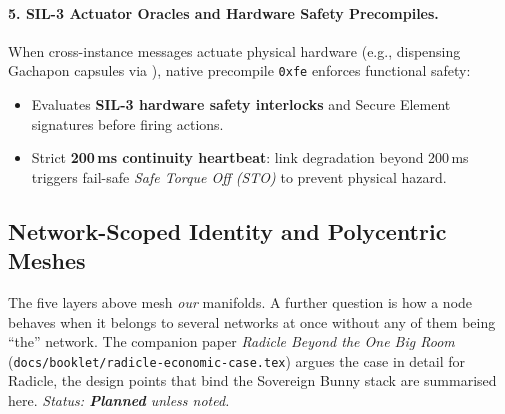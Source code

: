\documentclass[a4paper,11pt,twoside,parskip=half-,headings=small]{scrartcl}
\newcommand{\stPlan}{\textcolor{mute}{\textbf{Planned}}}
\newcommand{\code}[1]{\texttt{#1}}
\begin{document}
\paragraph{5. SIL-3 Actuator Oracles and Hardware Safety Precompiles.}
When cross-instance messages actuate physical hardware (e.g., dispensing Gachapon capsules via ), native precompile \code{0xfe} enforces functional safety:
\begin{itemize}[nosep]
  \item Evaluates \textbf{SIL-3 hardware safety interlocks} and Secure Element signatures before firing actions.
  \item Strict \textbf{200\,ms continuity heartbeat}: link degradation beyond 200\,ms triggers fail-safe \emph{Safe Torque Off (STO)} to prevent physical hazard.
\end{itemize}

\subsection{Network-Scoped Identity and Polycentric Meshes}
\label{sec:scoped_networks}

The five layers above mesh \emph{our} manifolds. A further question is how a node behaves when it belongs to several
networks at once without any of them being ``the'' network. The companion paper
\emph{Radicle Beyond the One Big Room} (\code{docs/booklet/radicle-economic-case.tex}) argues the case in detail for Radicle,
the design points that bind the Sovereign Bunny stack are summarised here. \emph{Status: \stPlan{} unless noted.}
\end{document}
